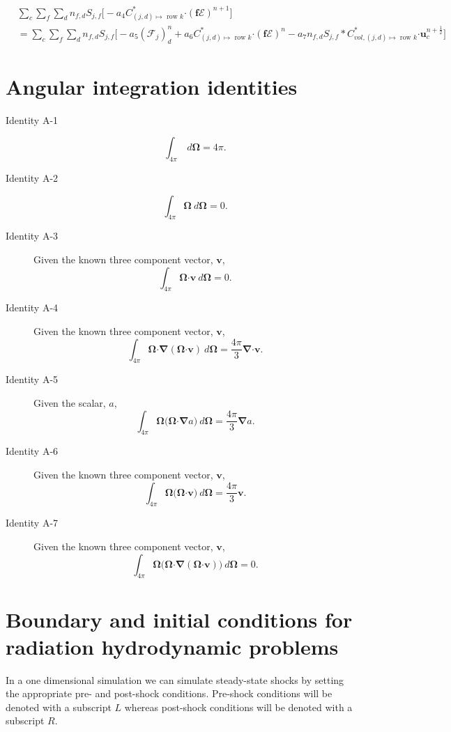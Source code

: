 \documentclass[10pt,letterpaper,notitlepage]{article}
\numberwithin{equation}{section}
\newcommand{\Omegabf}{\mathbf{\Omega}}
\newcommand{\bnabla}{\boldsymbol{\nabla}}
\newcommand{\velocity}{\mathbf{u}}
\newcommand{\dotp}{\boldsymbol{\cdot}}
\newcommand{\RadE}{\mathcal{E}}
\newcommand{\RadF}{\boldsymbol{\mathcal{F}}}
\newcommand{\half}{\frac{1}{2}}
\newcommand{\beqn}{\begin{equation}\begin{aligned}}
\newcommand{\eeqn}{\end{aligned}\end{equation}}
\begin{document}
\beqn 
&\sum_c \sum_f \sum_d n_{f,d} S_{j,f} \biggr[ -a_4
C^*_{(j,d)\mapsto \text{ row } k} \dotp (\mathbf{f}\boldsymbol{\RadE})^{n+1}
\biggr]\\
&=
\sum_c \sum_f \sum_d n_{f,d} S_{j,f} \biggr[ 
-a_5 (\RadF_j)_d^{n}
+a_6
C^*_{(j,d)\mapsto \text{ row } k} \dotp (\mathbf{f}\boldsymbol{\RadE})^{n}
-a_7
n_{f,d} S_{j,f} * C_{vol,(j,d)\mapsto \text{ row } k}^* \dotp \velocity_c^{n+\half}
\biggr]
\eeqn 


\newpage
\begin{appendices}
\section{Angular integration identities} \label{appendix:angle_integration_identities}
\begin{description}
	\item [Identity A-1]
	$$\int_{4\pi}  \ d\Omegabf = 4\pi.$$
	
	\item [Identity A-2]
	$$\int_{4\pi} \Omegabf \ d\Omegabf = 0.$$
	
	\item [Identity A-3] Given the known three component vector, $\mathbf{v}$,
	$$\int_{4\pi} \Omegabf \dotp \mathbf{v} \ d\Omegabf = 0.$$
	
	\item [Identity A-4] Given the known three component vector, $\mathbf{v}$,
	$$\int_{4\pi} \Omegabf \dotp \bnabla (\Omegabf \dotp \mathbf{v}) \ d\Omegabf = \frac{4\pi}{3} \bnabla \dotp \mathbf{v}.$$
	
	\item [Identity A-5] Given the scalar, $a$,
	$$\int_{4\pi} \Omegabf \biggr( \Omegabf \dotp \bnabla a \biggr) \ d\Omegabf = \frac{4\pi}{3} \bnabla a.$$
	
	\item [Identity A-6] Given the known three component vector, $\mathbf{v}$,
	$$\int_{4\pi} \Omegabf \biggr( \Omegabf \dotp \mathbf{v} \biggr) \ d\Omegabf = \frac{4\pi}{3} \mathbf{v} .$$
	
	\item [Identity A-7] Given the known three component vector, $\mathbf{v}$,
	$$\int_{4\pi} \Omegabf \biggr( \Omegabf \dotp \bnabla (\Omegabf \dotp \mathbf{v}) \biggr) \ d\Omegabf = 0 .$$
	
\end{description}

\newpage
\section{Boundary and initial conditions for radiation hydrodynamic problems} \label{appendix:bndry_initial_conditions}
In a one dimensional simulation we can simulate steady-state shocks by setting the appropriate pre- and post-shock conditions. Pre-shock conditions will be denoted with a subscript $L$ whereas post-shock conditions will be denoted with a subscript $R$. 


\end{appendices}
\end{document}
